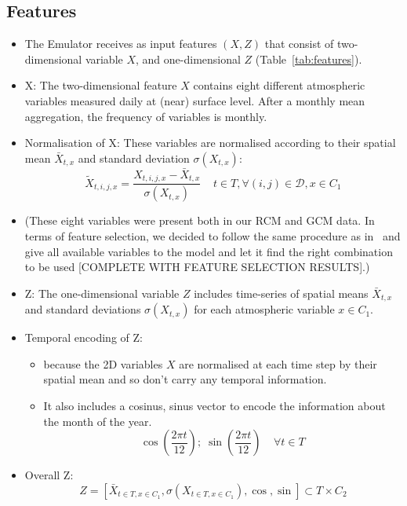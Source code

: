 \documentclass[a4paper,11pt,oneside]{report}
\begin{document}
\subsection{Features}\label{subsec:features}
\begin{itemize}
    \item The Emulator receives as input features $(X, Z)$ that consist of two-dimensional variable $X$, and one-dimensional $Z$ (Table~\ref{tab:features}). 
    \item X: The two-dimensional feature $X$ contains eight different atmospheric variables measured daily at (near) surface level. After a monthly mean aggregation, the frequency of variables is monthly.
    \item Normalisation of X: These variables are normalised according to their spatial mean $\bar{X}_{t,x}$ and standard deviation $\sigma(X_{t,x})$:
    \begin{equation}\label{eq:normalisation-X}
    \tilde{X}_{t,i,j,x} = \frac{X_{t,i,j,x}-\bar{X}_{t,x}}{\sigma(X_{t,x})} \;\;\;\; t\in T, \forall (i,j) \in \mathcal{D}, x\in C_1
\end{equation}
    \item (These eight variables were present both in our RCM and GCM data. In terms of feature selection, we decided to follow the same procedure as in~\cite{Doury} and give all available variables to the model and let it find the right combination to be used [COMPLETE WITH FEATURE SELECTION RESULTS].)
    
\item Z: The one-dimensional variable $Z$ includes time-series of spatial means $\bar{X}_{t,x}$ and standard deviations $\sigma(X_{t,x})$ for each atmospheric variable $x\in C_1$.
\item Temporal encoding of Z: 
\begin{itemize}
    \item because the 2D variables $X$ are normalised at each time step by their spatial mean and so don’t carry any temporal information.
    \item It also includes a cosinus, sinus vector to encode the information about the month of the year.
    \begin{equation}
        \operatorname{cos}\left(\frac{2\pi t}{12}\right);\; \operatorname{sin}\left(\frac{2\pi t}{12}\right) \;\;\;\; \forall t\in T
    \end{equation}
\end{itemize}

\item Overall Z: 
\begin{equation}
    Z = \left[ \bar{X}_{t\in T, x\in C_1}, \sigma\left(X_{t\in T, x\in C_1}\right), \operatorname{cos}, \operatorname{sin} \right] \subset T \times C_2
\end{equation}


\end{itemize}
\end{document}
